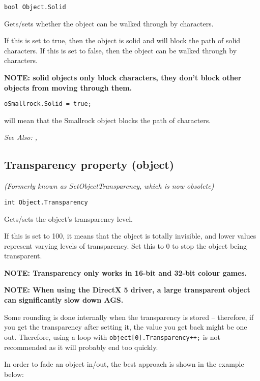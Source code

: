 \begin{verbatim}
bool Object.Solid
\end{verbatim}
Gets/sets whether the object can be walked through by characters.

If this is set to true, then the object is solid and will block the path of solid
characters. If this is set to false, then the object can be walked through by
characters.

\bf{NOTE:} solid objects only block characters, they don't block other objects from
moving through them.

\begin{verbatim}
oSmallrock.Solid = true;
\end{verbatim}
will mean that the Smallrock object blocks the path of characters.

\it{See Also:} ,


\subsection{Transparency property (object)}\label{Object.Transparency}%

\it{(Formerly known as SetObjectTransparency, which is now obsolete)}

\begin{verbatim}
int Object.Transparency
\end{verbatim}
Gets/sets the object's transparency level.

If this is set to 100, it means that the object is totally invisible, and lower values
represent varying levels of transparency. Set this to 0 to stop the object being transparent.

\bf{NOTE:} Transparency only works in 16-bit and 32-bit colour games.

\bf{NOTE:} When using the DirectX 5 driver, a large transparent object can significantly slow
down AGS.

Some rounding is done internally when the transparency is stored -- therefore, if you get
the transparency after setting it, the value you get back might be one out. Therefore, using
a loop with \verb$object[0].Transparency++;$ is not recommended as it will probably
end too quickly.

In order to fade an object in/out, the best approach is shown in the example below:

